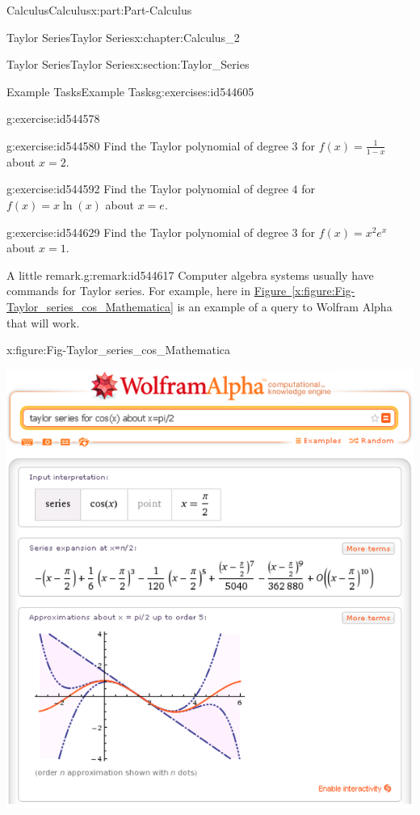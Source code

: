 \documentclass[oneside,10pt,]{book}
\newcommand{\xreffont}{\relax}
\numberwithin{equation}{section}
\begin{document}
\begin{partptx}{Calculus}{}{Calculus}{}{}{x:part:Part-Calculus}
\begin{chapterptx}{Taylor Series}{}{Taylor Series}{}{}{x:chapter:Calculus_2}
\begin{sectionptx}{Taylor Series}{}{Taylor Series}{}{}{x:section:Taylor_Series}
\begin{exercises-subsection-numberless}{Example Tasks}{}{Example Tasks}{}{}{g:exercises:id544605}
\begin{divisionexercise}{1}{}{}{g:exercise:id544578}
\end{divisionexercise}%
\begin{divisionexercise}{2}{}{}{g:exercise:id544580}%
Find the Taylor polynomial of degree  \(3 \) for   \(f(x)=\frac{1}{1-x} \) about \(x=2. \)%
\end{divisionexercise}%
\begin{divisionexercise}{3}{}{}{g:exercise:id544592}%
Find the Taylor polynomial of degree  \(4 \) for   \(f(x)=x\ln(x) \) about \(x=e. \)%
\end{divisionexercise}%
\begin{divisionexercise}{4}{}{}{g:exercise:id544629}%
Find the Taylor polynomial of degree  \(3  \) for   \(f(x)=x^2 e^{x} \) about \(x=1. \)%
\end{divisionexercise}%
\end{exercises-subsection-numberless}
\begin{remark}{A little remark.}{g:remark:id544617}%
Computer algebra systems usually have commands for Taylor series. For example, here in \hyperref[x:figure:Fig-Taylor_series_cos_Mathematica]{Figure~{\xreffont\ref{x:figure:Fig-Taylor_series_cos_Mathematica}}} is an example of a query to Wolfram Alpha that will work.%
\begin{figureptx}{}{x:figure:Fig-Taylor_series_cos_Mathematica}{}%
\begin{image}{0.05}{0.9}{0.05}%
\includegraphics[width=\linewidth]{./Calculus/Images/2/Taylor_series_cos_Mathematica.png}

\end{image}
\end{figureptx}
\end{remark}
\end{sectionptx}
\end{chapterptx}
\end{partptx}
\end{document}
